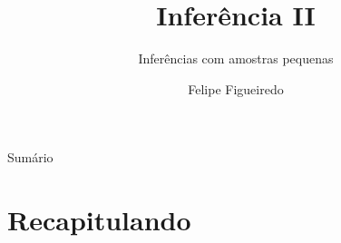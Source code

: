 \documentclass{beamer}
\title%
{Inferência II}
\subtitle
{Inferências com amostras pequenas} %
\author%
{Felipe Figueiredo}%
\institute[INTO] %
{Instituto Nacional de Traumatologia e Ortopedia
}
\date%
{}
\begin{document}
\begin{frame}
  \titlepage
\end{frame}

\begin{frame}{Sumário}
  \tableofcontents
\end{frame}








\section{Recapitulando}
\end{document}

